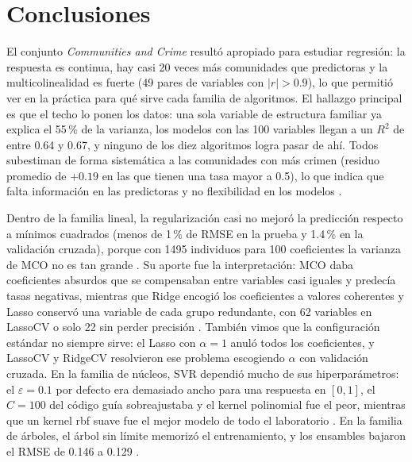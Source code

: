 \documentclass[11pt,a4paper]{article}
\let\citepOriginal\citep
\renewcommand*{\citep}[1]{\textbf{\citepOriginal{#1}}}%
\begin{document}
\section{Conclusiones}

El conjunto \textit{Communities and Crime} resultó apropiado para estudiar regresión: la respuesta es continua, hay casi 20 veces más comunidades que predictoras y la multicolinealidad es fuerte (49 pares de variables con $|r|>0.9$), lo que permitió ver en la práctica para qué sirve cada familia de algoritmos. El hallazgo principal es que el techo lo ponen los datos: una sola variable de estructura familiar ya explica el 55\,\% de la varianza, los modelos con las 100 variables llegan a un $R^2$ de entre 0.64 y 0.67, y ninguno de los diez algoritmos logra pasar de ahí. Todos subestiman de forma sistemática a las comunidades con más crimen (residuo promedio de $+0.19$ en las que tienen una tasa mayor a 0.5), lo que indica que falta información en las predictoras y no flexibilidad en los modelos \citep{james2013}.

Dentro de la familia lineal, la regularización casi no mejoró la predicción respecto a mínimos cuadrados (menos de 1\,\% de RMSE en la prueba y 1.4\,\% en la validación cruzada), porque con 1495 individuos para 100 coeficientes la varianza de MCO no es tan grande \citep{hastie2009}. Su aporte fue la interpretación: MCO daba coeficientes absurdos que se compensaban entre variables casi iguales y predecía tasas negativas, mientras que Ridge encogió los coeficientes a valores coherentes \citep{hoerl1970} y Lasso conservó una variable de cada grupo redundante, con 62 variables en LassoCV o solo 22 sin perder precisión \citep{tibshirani1996,zou2005}. También vimos que la configuración estándar no siempre sirve: el Lasso con $\alpha=1$ anuló todos los coeficientes, y LassoCV y RidgeCV resolvieron ese problema escogiendo $\alpha$ con validación cruzada. En la familia de núcleos, SVR dependió mucho de sus hiperparámetros: el $\varepsilon=0.1$ por defecto era demasiado ancho para una respuesta en $[0,1]$, el $C=100$ del código guía sobreajustaba y el kernel polinomial fue el peor, mientras que un kernel rbf suave fue el mejor modelo de todo el laboratorio \citep{smola2004}. En la familia de árboles, el árbol sin límite memorizó el entrenamiento, y los ensambles bajaron el RMSE de 0.146 a 0.129 \citep{breiman2001,chen2016}.
\end{document}

